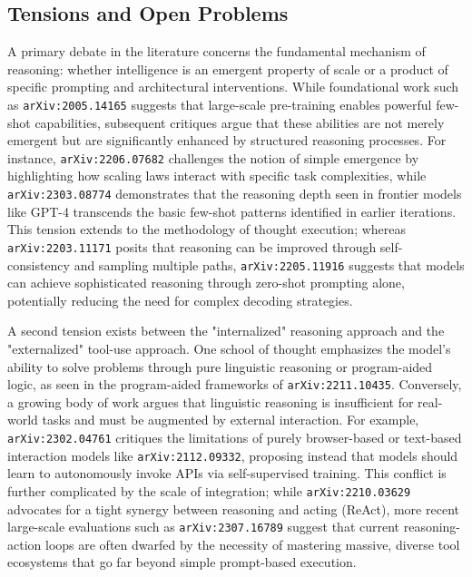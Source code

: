 \documentclass[11pt]{article}
\begin{document}
\subsection{Tensions and Open Problems}

A primary debate in the literature concerns the fundamental mechanism of reasoning: whether intelligence is an emergent property of scale or a product of specific prompting and architectural interventions. While foundational work such as \texttt{arXiv:2005.14165} suggests that large-scale pre-training enables powerful few-shot capabilities, subsequent critiques argue that these abilities are not merely emergent but are significantly enhanced by structured reasoning processes. For instance, \texttt{arXiv:2206.07682} challenges the notion of simple emergence by highlighting how scaling laws interact with specific task complexities, while \texttt{arXiv:2303.08774} demonstrates that the reasoning depth seen in frontier models like GPT-4 transcends the basic few-shot patterns identified in earlier iterations. This tension extends to the methodology of thought execution; whereas \texttt{arXiv:2203.11171} posits that reasoning can be improved through self-consistency and sampling multiple paths, \texttt{arXiv:2205.11916} suggests that models can achieve sophisticated reasoning through zero-shot prompting alone, potentially reducing the need for complex decoding strategies.

A second tension exists between the "internalized" reasoning approach and the "externalized" tool-use approach. One school of thought emphasizes the model's ability to solve problems through pure linguistic reasoning or program-aided logic, as seen in the program-aided frameworks of \texttt{arXiv:2211.10435}. Conversely, a growing body of work argues that linguistic reasoning is insufficient for real-world tasks and must be augmented by external interaction. For example, \texttt{arXiv:2302.04761} critiques the limitations of purely browser-based or text-based interaction models like \texttt{arXiv:2112.09332}, proposing instead that models should learn to autonomously invoke APIs via self-supervised training. This conflict is further complicated by the scale of integration; while \texttt{arXiv:2210.03629} advocates for a tight synergy between reasoning and acting (ReAct), more recent large-scale evaluations such as \texttt{arXiv:2307.16789} suggest that current reasoning-action loops are often dwarfed by the necessity of mastering massive, diverse tool ecosystems that go far beyond simple prompt-based execution.
\end{document}
